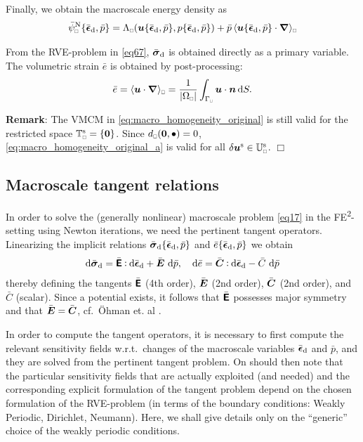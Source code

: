 \documentclass{bmcart}
\newcommand{\eqtref}[1]{\eqref{#1}}
\DeclarePairedDelimiter{\homgen}{\langle}{\rangle_\rve}
\renewcommand{\dev}{\mathrm{d}}
\newcommand{\volume}{|\Omega_\rve|}
\newcommand{\epspargs}{\{{\bar{\ts\epsilon}}_\dev, \bar{p}\}}
\newcommand{\rve}{
  {\mathchoice
   {\mbox{\scalebox{0.67}{$\Box$}}}
   {\mbox{\scalebox{0.67}{$\Box$}}}
   {\mbox{\scalebox{0.5}{$\Box$}}}
   {\mbox{\scalebox{0.375}{$\Box$}}}
  }
}
\begin{document}
Finally, we obtain the macroscale energy density as
\begin{equation}
    \bar{\psi}_\rve^\Neumann\epspargs =
    \Lambda_\rve(\ta{u}\epspargs,p\epspargs) + \bar{p}\,\homgen{ \ta{u}\epspargs\cdot\diff }
\label{eq105}
\end{equation}

From the RVE-problem in \eqtref{eq67}, $\bar{\ts\sigma}_\dev$ is obtained directly as a primary variable.
The volumetric strain $\bar{e}$ is obtained by post-processing:
\begin{align}
 \bar{e} = \homgen{\ta u\cdot\diff} = \frac{1}{\volume} \int_{\Gamma_\rve} \ta u \cdot \ta n\dif S.
\end{align}

\textbf{Remark}:
The VMCM in \eqtref{eq:macro_homogeneity_original} is still valid for the restricted space $\set{T}_\rve^\fluct = \{\ta 0\}$.
Since $d_\rve(\ta 0, \bullet) = 0$, \eqtref{eq:macro_homogeneity_original_a} is valid for all $\delta\ta u^\fluct \in \set U_\rve^\fluct$. $\Box$


\subsection{Macroscale tangent relations}
In order to solve the (generally nonlinear) macroscale problem \eqtref{eq17} in the FE\textsuperscript{2}-setting using Newton iterations, we need the pertinent tangent operators.
Linearizing the implicit relations $\bar{\ts\sigma}_\dev\epspargs$ and $\bar{e}\epspargs$ we obtain
\begin{align}
 \dif\bar{\ts\sigma}_\dev = \bar{\tf E} \dprod \dif\bar{\ts\epsilon}_\dev + \bar{\ts E}\, \dif\bar{p},
\quad
 \dif\bar{e} = \bar{\ts C} \dprod \dif\bar{\ts\epsilon}_\dev - \bar{C}\, \dif\bar{p}
\label{eq:periodic_difsigma}
\end{align}
thereby defining the tangents $\bar{\boldsymbol{\mathsf{E}}}$ (4th order), $\bar{\boldsymbol{E}}$ (2nd order), $\bar{\boldsymbol{C}}$ (2nd order), and $\bar{C}$ (scalar).
Since a potential exists, it follows that $\bar{\boldsymbol{\mathsf{E}}}$ possesses major symmetry and that $\bar{\boldsymbol{E}} = \bar{\boldsymbol{C}}$, cf.\ \"Ohman et. al \cite{ohman_computational_2012}.

In order to compute the tangent operators, it is necessary to first compute the relevant sensitivity fields w.r.t.\ changes of the macroscale variables $\bar{\ts\epsilon}_\dev$ and $\bar{p}$, and they are solved from the pertinent tangent problem.
On should then note that the particular sensitivity fields that are actually exploited (and needed) and the corresponding explicit formulation of the tangent problem depend on the chosen formulation of the RVE-problem (in terms of the boundary conditions: Weakly Periodic, Dirichlet, Neumann). 
Here, we shall give details only on the ``generic'' choice of the weakly periodic conditions.
\end{document}
